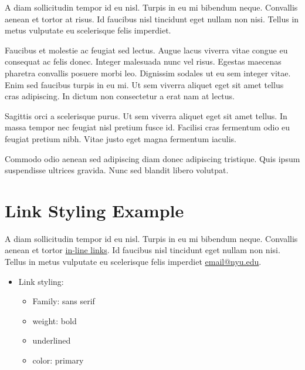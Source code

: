 \documentclass{nyu22report}
\begin{document}
A diam sollicitudin tempor id eu nisl. Turpis in eu mi bibendum neque. Convallis
aenean et tortor at risus. Id faucibus nisl tincidunt eget nullam non nisi.
Tellus in metus vulputate eu scelerisque felis imperdiet.

Faucibus et molestie ac feugiat sed lectus. Augue lacus viverra vitae congue eu
consequat ac felis donec. Integer malesuada nunc vel risus. Egestas maecenas
pharetra convallis posuere morbi leo. Dignissim sodales ut eu sem integer vitae.
Enim sed faucibus turpis in eu mi. Ut sem viverra aliquet eget sit amet tellus
cras adipiscing. In dictum non consectetur a erat nam at lectus.

Sagittis orci a scelerisque purus. Ut sem viverra aliquet eget sit amet tellus.
In massa tempor nec feugiat nisl pretium fusce id. Facilisi cras fermentum odio
eu feugiat pretium nibh. Vitae justo eget magna fermentum iaculis.

Commodo odio aenean sed adipiscing diam donec adipiscing tristique. Quis ipsum
suspendisse ultrices gravida. Nunc sed blandit libero volutpat.

\section{Link Styling Example}

A diam sollicitudin tempor id eu nisl. Turpis in eu mi bibendum neque. Convallis
aenean et tortor \href{https://www.nyu.edu/}{in-line links}. Id faucibus nisl
tincidunt eget nullam non nisi. Tellus in metus vulputate eu scelerisque felis
imperdiet \href{mailto:email@nyu.edu}{email@nyu.edu}. 

\begin{itemize}
    \item Link styling:
    \begin{itemize}
        \item Family: sans serif
        \item weight: bold
        \item underlined
        \item color: primary
    \end{itemize}
\end{itemize}
\end{document}

